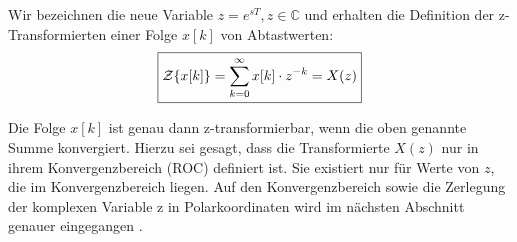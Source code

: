 Wir bezeichnen die neue Variable $z=e^{sT}, z \in \mathbb{C}$ und erhalten die Definition der z-Transformierten einer Folge $x[k]$ von Abtastwerten:
\begin{equation} 
\boxed{
    \label{eq:z_transformation_definition}
    \mathcal{Z}\{x[k]\} = \sum_{k=0}^{\infty} x[k] \cdot z^{-k} = X(z)
    }
\end{equation}


Die Folge $x[k]$ ist genau dann z-transformierbar, wenn die oben genannte Summe konvergiert.
Hierzu sei gesagt, dass die Transformierte $X(z)$ nur in ihrem Konvergenzbereich (ROC) definiert ist. Sie existiert nur für Werte von $z$, die im Konvergenzbereich liegen. 
Auf den Konvergenzbereich sowie die Zerlegung der komplexen Variable z in Polarkoordinaten wird im nächsten Abschnitt genauer eingegangen \cite[S.207]{book4}\cite[S.233]{book2}.
